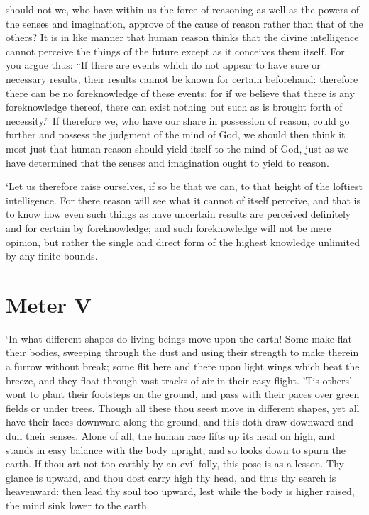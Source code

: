 should not we, who have within us the force of reasoning as well as
the powers of the senses and imagination, approve of the cause of
reason rather than that of the others? It is in like manner that human
reason thinks that  the divine intelligence cannot perceive
the things of the future except as it conceives them itself. For you
argue thus: ``If there are events which do not appear to have sure or
necessary results, their results cannot be known for certain
beforehand: therefore there can be no foreknowledge of these events;
for if we believe that there is any foreknowledge thereof, there can
exist nothing but such as is brought forth of necessity.'' If
therefore we, who have our share in possession of reason, could go
further and possess the judgment of the mind of God, we should then
think it most just that human reason should yield itself to the mind
of God, just as we have determined that the senses and imagination
ought to yield to reason.

`Let us therefore raise ourselves, if so be that we can, to that
height of the loftiest intelligence. For there reason will see what it
cannot of itself perceive, and that is to know how even such things as
have uncertain results are perceived definitely and for certain by
foreknowledge; and such foreknowledge will not be mere opinion, but
rather the single and direct form of the highest knowledge unlimited
by any finite bounds.

\section{Meter V}

`In what different shapes do living beings move upon the earth! Some
make flat their bodies, sweeping through the dust and using their
strength to make therein a furrow without break; some flit here and
there upon light wings  which beat the breeze, and they
float through vast tracks of air in their easy flight. 'Tis others'
wont to plant their footsteps on the ground, and pass with their paces
over green fields or under trees. Though all these thou seest move in
different shapes, yet all have their faces downward along the ground,
and this doth draw downward and dull their senses. Alone of all, the
human race lifts up its head on high, and stands in easy balance with
the body upright, and so looks down to spurn the earth. If thou art
not too earthly by an evil folly, this pose is as a lesson. Thy glance
is upward, and thou dost carry high thy head, and thus thy search is
heavenward: then lead thy soul too upward, lest while the body is
higher raised, the mind sink lower to the earth.

